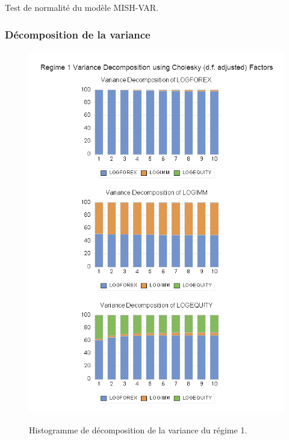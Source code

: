 \begin{table}[H]
    \centering
    \sffamily
    \caption{Test de normalité du modèle MISH-VAR.}
    \label{tab:test_normalite_var}
    \resizebox{1\textwidth}{!}{}
\end{table}

\subsubsection{Décomposition de la variance}

\begin{figure}[H]
    \centering
    \caption{Histogramme de décomposition de la variance du régime 1.}
    \includegraphics[scale=0.9]{annexes/regime_1.png}
    \label{fig:hist_variance_r1}
\end{figure}

